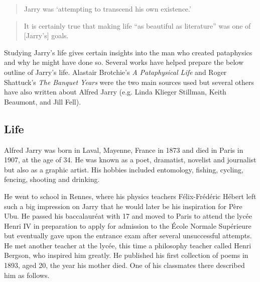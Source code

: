 \begin{quotation}
  Jarry was `attempting to transcend his own existence.' 
\end{quotation}

\begin{quotation}
  It is certainly true that making life ``as beautiful as literature'' was one of [Jarry's] goals. 
\end{quotation}

Studying Jarry's life gives certain insights into the man who created pataphysics and why he might have done so. Several works have helped prepare the below outline of Jarry's life. Alastair Brotchie's \textit{A Pataphysical Life} \autocite*{Brotchie2011a} and Roger Shattuck's \textit{The Banquet Years} \autocite*{Shattuck1959} were the two main sources used but several others have also written about Alfred Jarry (e.g. Linda Klieger Stillman, Keith Beaumont, and Jill Fell).


\subsection{Life}

Alfred Jarry was born in Laval, Mayenne, France in 1873 and died in Paris in 1907, at the age of 34. He was known as a poet, dramatist, novelist and journalist but also as a graphic artist. His hobbies included entomology, fishing, cycling, fencing, shooting and drinking.


He went to school in Rennes, where his physics teachers Félix-Frédéric Hébert left such a big impression on Jarry that he would later be his inspiration for Père Ubu. He passed his baccalauréat with 17 and moved to Paris to attend the lycée Henri IV in preparation to apply for admission to the École Normale Supérieure but eventually gave upon the entrance exam after several unsuccessful attempts. He met another teacher at the lycée, this time a philosophy teacher called Henri Bergson, who inspired him greatly. He published his first collection of poems in 1893, aged 20, the year his mother died. One of his classmates there described him as follows.

